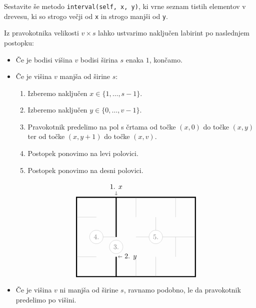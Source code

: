 \documentclass[arhiv]{izpit}
\begin{document}

\podnaloga[+10 točk]
%
Sestavite še metodo \verb|interval(self, x, y)|, ki vrne seznam tistih
elementov v drevesu, ki so strogo večji od \verb|x| in strogo manjši
od \verb|y|.


\naloga[25 točk]

Iz pravokotnika velikosti $v \times s$ lahko ustvarimo naključen
labirint po naslednjem postopku:
\begin{itemize}
\item Če je bodisi višina $v$ bodisi širina $s$ enaka $1$, končamo.
\item Če je višina $v$ manjša od širine $s$:
  \begin{enumerate}
  \item Izberemo naključen $x \in \{1, \dots, s - 1\}$.
  \item Izberemo naključen $y \in \{0, \dots, v - 1\}$.
  \item Pravokotnik predelimo na pol s črtama od točke $(x, 0)$ do točke
    $(x, y)$ ter od točke $(x, y + 1)$ do točke $(x, v)$.
  \item Postopek ponovimo na levi polovici.
  \item Postopek ponovimo na desni polovici.
  \end{enumerate}
  \[
  \begin{tikzpicture}
    \draw[ultra thick] (0, 0) rectangle (6, 4);
    \draw[<-] (2, 4.1) -- (2, 4.3) node[anchor=south] {1. $x$};
    \draw[<-] (2.1, 1) -- (2.3, 1) node[anchor=west] {2. $y$};
    \draw[ultra thick] (2, 0) -- (2, 1) (2, 2) -- (2, 4);
    \draw (2, 1.5) node[draw, circle, help lines, fill=white] {3.};
    
    \draw[help lines]
    (1, 2) node[draw, circle, fill=white] {4.}
    (0, 3) -- (1, 3)
    (1, 2) -- (2, 2)
    (0, 1) -- (1, 1);
    \draw[help lines]
    (4, 2) node[draw, circle, fill=white] {5.}
    (3, 2) -- (6, 2)
    (4, 2) -- (4, 3)
    (5, 2) -- (5, 1)
    (3, 0) -- (3, 1)
    (4, 0) -- (4, 1)
    (3, 3) -- (3, 4)
    (5, 3) -- (5, 4)
    ;
  \end{tikzpicture}
  \]
\item Če je višina $v$ ni manjša od širine $s$, ravnamo podobno, le da
  pravokotnik predelimo po višini.
\end{itemize}
\end{document}
